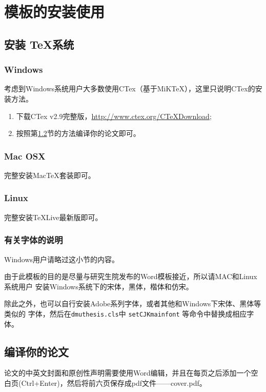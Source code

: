 
\chapter{模板的安装使用}\label{ch:install}

\section{安装 \TeX 系统}
\subsection{Windows}
考虑到Windows系统用户大多数使用CTex（基于MiKTeX），这里只说明CTex的安装方法。
\begin{enumerate}
\item 下载CTex v2.9完整版，\url{http://www.ctex.org/CTeXDownload};
\item 按照第\ref{sect:compile}节的方法编译你的论文即可。
\end{enumerate}

\subsection{Mac OSX}

完整安装MacTeX套装即可。

\subsection{Linux}

完整安装TeXLive最新版即可。

\subsection{有关字体的说明}
Windows用户请略过这小节的内容。

 由于此模板的目的是尽量与研究生院发布的Word模板接近，所以请MAC和Linux系统用户
 安装Windows系统下的宋体，黑体，楷体和仿宋。

除此之外，也可以自行安装Adobe系列字体，或者其他和Windows下宋体、黑体等类似的
字体，然后在\texttt{dmuthesis.cls}中 \texttt{setCJKmainfont} 
等命令中替换成相应字体。


\section{编译你的论文}\label{sect:compile}

论文的中英文封面和原创性声明需要使用Word编辑，并且在每页之后添加一个空白页(Ctrl+Enter)，然后将前六页保存成pdf文件——cover.pdf。

